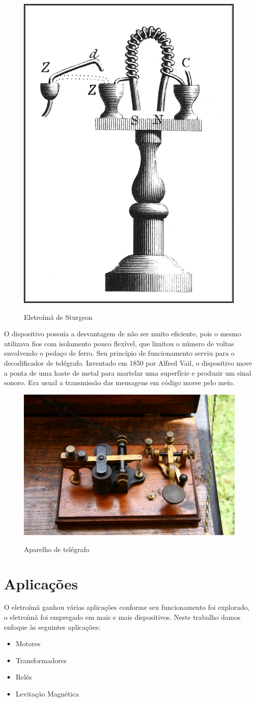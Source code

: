 \documentclass[
        12pt,                           %
        openright,                      %
        twoside,                        %
        a4paper,                        %
        english,                        %
        french,                         %
        spanish,                        %
        brazil                          %
        ]{abntex2}
\begin{document}
\begin{figure}[htp]
  \centering
  \includegraphics[width=0.2\columnwidth]{Sturgeon_electromagnet.png}
  \label{fig:chap:introdução:1}
  \caption{Eletroímã de Sturgeon \cite{web:wikipedia:electromagnet}}
\end{figure}
O dispositivo possuía a desvantagem de não ser muito eficiente, pois o mesmo utilizava
fios com isolamento pouco flexível, que limitou o número de voltas envolvendo o
pedaço de ferro. Seu princípio de funcionamento serviu para o decodificador de telégrafo. Inventado
em 1850 por Alfred Vail, o dispositivo move a ponta de uma haste de metal para
martelar uma superfície e produzir um sinal sonoro. Era usual a transmissão das
mensagens em código morse pelo meio.
\begin{figure}[htp]
  \centering
  \includegraphics[width=0.3\columnwidth]{Wallace_Study-Telegraph.jpg}
  \label{fig:chap:introdução:2}
  \caption{Aparelho de telégrafo \cite{web:wikipedia:telegraph}}
\end{figure}

\section{Aplicações} \label{chap:introducao:sec:aplicações}
O eletroímã ganhou várias aplicações conforme seu funcionamento foi explorado, o
eletroímã foi empregado em mais e mais dispositivos. Neste trabalho damos enfoque
às seguintes aplicações:
\begin{itemize}
  \item Motores
  \item Transformadores
  \item Relés
  \item Levitação Magnética
\end{itemize}
\end{document}
